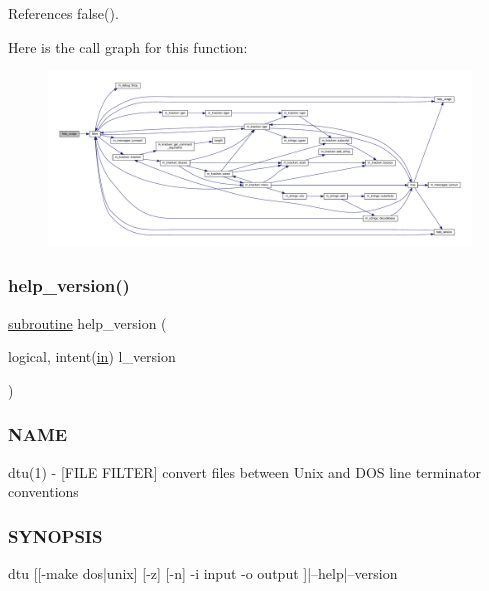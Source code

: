 References false().

Here is the call graph for this function\+:
\nopagebreak
\begin{figure}[H]
\begin{center}
\leavevmode
\includegraphics[width=350pt]{dtu_8f90_a3e09a3b52ee8fb04eeb93fe5761626a8_cgraph}
\end{center}
\end{figure}
\mbox{\label{dtu_8f90_a39c21619b08a3c22f19e2306efd7f766}} 
\subsubsection{\texorpdfstring{help\+\_\+version()}{help\_version()}}
{\footnotesize\ttfamily \hyperlink{M__stopwatch_83_8txt_acfbcff50169d691ff02d4a123ed70482}{subroutine} help\+\_\+version (\begin{DoxyParamCaption}\item[{logical, intent(\hyperlink{M__journal_83_8txt_afce72651d1eed785a2132bee863b2f38}{in})}]{l\+\_\+version }\end{DoxyParamCaption})}



\subsubsection*{N\+A\+ME}

dtu(1) -\/ \mbox{[}F\+I\+LE F\+I\+L\+T\+ER\mbox{]} convert files between Unix and D\+OS line terminator conventions 

\subsubsection*{S\+Y\+N\+O\+P\+S\+IS}

\begin{DoxyVerb}    dtu [[-make dos|unix] [-z] [-n] -i input -o output ]|--help|--version
\end{DoxyVerb}


